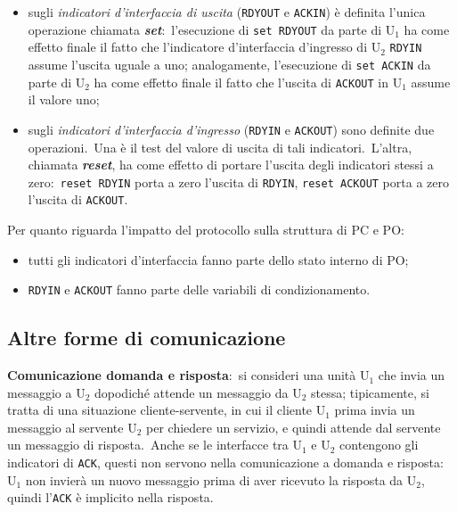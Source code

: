 \begin{itemize}
    \item sugli \textit{indicatori d'interfaccia di uscita} (\texttt{RDYOUT} e \texttt{ACKIN}) è definita l'unica operazione chiamata \textbf{\textit{set}}:\ l'esecuzione di \texttt{set RDYOUT} da parte di $\mathrm{U}_1$ ha come effetto finale il fatto che l'indicatore d'interfaccia d'ingresso di $\mathrm{U}_2$ \texttt{RDYIN} assume l'uscita uguale a uno; analogamente, l'esecuzione di \texttt{set ACKIN} da parte di $\mathrm{U}_2$ ha come effetto finale il fatto che l'uscita di \texttt{ACKOUT} in $\mathrm{U}_1$ assume il valore uno;
    \item sugli \textit{indicatori d'interfaccia d'ingresso} (\texttt{RDYIN} e \texttt{ACKOUT}) sono definite due operazioni.\ Una è il test del valore di uscita di tali indicatori.\ L'altra, chiamata \textbf{\textit{reset}}, ha come effetto di portare l'uscita degli indicatori stessi a zero:\ \texttt{reset RDYIN} porta a zero l'uscita di \texttt{RDYIN}, \texttt{reset ACKOUT} porta a zero l'uscita di \texttt{ACKOUT}.
\end{itemize}

\noindent Per quanto riguarda l'impatto del protocollo sulla struttura di PC e PO:

\begin{itemize}
    \item tutti gli indicatori d'interfaccia fanno parte dello stato interno di PO;
    \item \texttt{RDYIN} e \texttt{ACKOUT} fanno parte delle variabili di condizionamento.
\end{itemize}

\subsection{Altre forme di comunicazione}

\textbf{Comunicazione domanda e risposta}:\ si consideri una unità $\mathrm{U}_1$ che invia un messaggio a $\mathrm{U}_2$ dopodiché attende un messaggio da $\mathrm{U}_2$ stessa; tipicamente, si tratta di una situazione cliente-servente, in cui il cliente $\mathrm{U}_1$ prima invia un messaggio al servente $\mathrm{U}_2$ per chiedere un servizio, e quindi attende dal servente un messaggio di risposta.\
Anche se le interfacce tra $\mathrm{U}_1$ e $\mathrm{U}_2$ contengono gli indicatori di \texttt{ACK}, questi non servono nella comunicazione a domanda e risposta:\ $\mathrm{U}_1$ non invierà un nuovo messaggio prima di aver ricevuto la risposta da $\mathrm{U}_2$, quindi l'\texttt{ACK} è implicito nella risposta.

